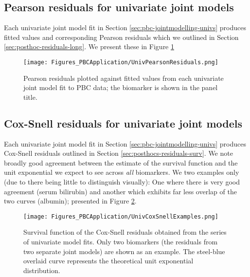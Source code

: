 \subsection{Pearson residuals for univariate joint models}\label{sec:appendix-suppfigs-univpearson}
Each univariate joint model fit in Section \ref{sec:pbc-jointmodelling-univs} produces fitted values and corresponding Pearson residuals which we outlined in Section \ref{sec:posthoc-residuals-long}. We present these in Figure \ref{fig:appendix-suppfigs-univpearson} 
\begin{figure}[ht]
    \centering
    \texttt{[image: Figures\_PBCApplication/UnivPearsonResiduals.png]}
    \caption{Pearson residuals plotted against fitted values from each univariate joint model fit to PBC data; the biomarker is shown in the panel title.}
    \label{fig:appendix-suppfigs-univpearson}
\end{figure}

\subsection{Cox-Snell residuals for univariate joint models}\label{sec:appendix-suppfigs-univcoxsnell}
Each univariate joint model fit in Section \ref{sec:pbc-jointmodelling-univs} produces Cox-Snell residuals outlined in Section \ref{sec:posthocs-residuals-surv}. We note broadly good agreement between the estimate of the survival function and the unit exponential we expect to see across \textit{all} biomarkers. We two examples only (due to there being little to distinguish visually): One where there is very good agreement (serum bilirubin) and another which exhibits far less overlap of the two curves (albumin); presented in Figure \ref{fig:appendix-suppfigs-univcoxsnell}.
\begin{figure}[ht]
    \centering
    \texttt{[image: Figures\_PBCApplication/UnivCoxSnellExamples.png]}
    \caption{Survival function of the Cox-Snell residuals obtained from the series of univariate model fits. Only two biomarkers (\ie the residuals from two separate joint models) are shown as an example. The steel-blue overlaid curve represents the theoretical unit exponential distribution.}
    \label{fig:appendix-suppfigs-univcoxsnell}
\end{figure}

